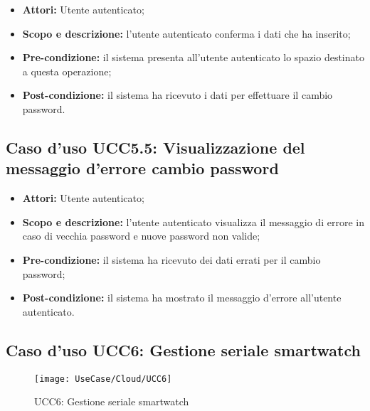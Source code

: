 \begin{itemize}
\item \textbf{Attori:} Utente autenticato;
\item \textbf{Scopo e descrizione:} l'utente autenticato conferma i dati che ha inserito;
\item \textbf{Pre-condizione:} il sistema presenta all'utente autenticato lo spazio destinato a questa operazione;
\item \textbf{Post-condizione:} il sistema ha ricevuto i dati per effettuare il cambio password.
\end{itemize}

\subsection{Caso d'uso UCC5.5: Visualizzazione del messaggio d'errore cambio password}

\begin{itemize}
\item \textbf{Attori:} Utente autenticato;
\item \textbf{Scopo e descrizione:} l'utente autenticato visualizza il messaggio di errore in caso di vecchia password e nuove password non valide;
\item \textbf{Pre-condizione:} il sistema ha ricevuto dei dati errati per il cambio password;
\item \textbf{Post-condizione:} il sistema ha mostrato il messaggio d'errore all'utente autenticato.
\end{itemize}



\subsection{Caso d'uso UCC6: Gestione seriale smartwatch}

\begin{figure}[H]
\centering
\texttt{[image: UseCase/Cloud/UCC6]}
\caption{UCC6: Gestione seriale smartwatch}
\end{figure}

